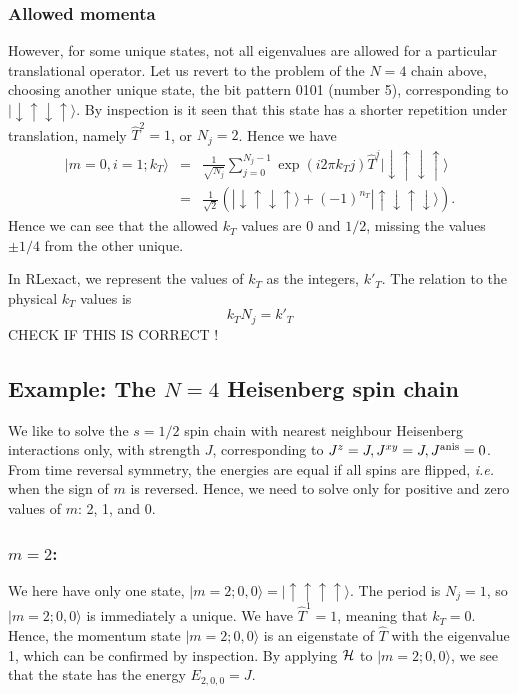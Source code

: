 \documentclass{article}
\begin{document}
\subsubsection{Allowed momenta}
However, for some unique states, not all eigenvalues are allowed for a particular translational operator. Let us revert to the problem of the $N=4$ chain above, choosing another unique state,
the bit pattern 0101 (number 5), corresponding to $|\downarrow\uparrow\downarrow\uparrow \rangle$. By inspection is it seen that
this state has a shorter repetition under translation, namely $\hat{T}^2 = 1$, or $N_j=2$. Hence we have
\begin{eqnarray}
| m=0, i=1; k_T \rangle
  &=& \frac{1}{\sqrt{N_j}} \sum_{j=0}^{N_j-1} \exp (i 2 \pi k_T j) \hat{T}^j |\downarrow \uparrow \downarrow \uparrow  \rangle \nonumber \\
 & =& \frac{1}{\sqrt{2}}\left( |\downarrow \uparrow \downarrow \uparrow \rangle 
 + (-1)^{n_T} |\uparrow \downarrow \uparrow \downarrow \rangle 
   \right) .
\end{eqnarray}
Hence we can see that the allowed $k_T$ values are $0$ and $1/2$, missing the values $\pm 1/4$ from the other unique.

In RLexact, we represent the values of $k_T$ as the integers, $k'_T$. The relation to the physical $k_T$ values is 
\begin{equation}
k_T N_j = k'_T  
\end{equation}
CHECK IF THIS IS CORRECT !


\subsection{Example: The $N=4$ Heisenberg spin chain}
We like to solve the $s=1/2$ spin chain with nearest neighbour Heisenberg interactions only, with strength $J$, corresponding to $J^z=J, J^{xy}=J, J^{\rm anis}=0$. From time reversal symmetry, the energies are equal if all spins are flipped, {\em i.e.} when the sign of $m$ is reversed. Hence, we need to solve only for positive and zero values of $m$: 2, 1, and 0.

\subsubsection*{$m=2$:} 
We here have only one state, $|m=2; 0, 0 \rangle = | \uparrow \uparrow \uparrow \uparrow \rangle$. The period is $N_j= 1$, so $|m=2; 0, 0 \rangle$ is immediately a unique. We have $\hat{T}^1 = 1$, meaning that $k_T = 0$. Hence, the momentum state $|m=2; 0, 0 \rangle$ is an eigenstate of $\hat{T}$ with the eigenvalue 1, which can be confirmed by inspection. By applying ${\cal H}$ to $|m=2; 0, 0 \rangle$, we see that the state has the energy $E_{2,0,0} = J$.
\end{document}
